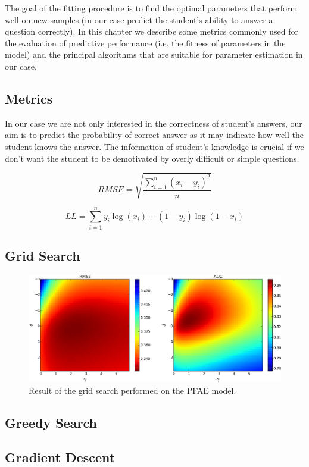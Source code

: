 The goal of the fitting procedure is to find the optimal parameters that perform well on new samples (in our case predict the student's ability to answer a question correctly). In this chapter we describe some metrics commonly used for the evaluation of predictive performance (i.e. the fitness of parameters in the model) and the principal algorithms that are suitable for parameter estimation in our case.

\subsection{Metrics}

In our case we are not only interested in the correctness of student's answers, our aim is to predict the probability of correct answer as it may indicate how well the student knows the answer. The information of student's knowledge is crucial if we don't want the student to be demotivated by overly difficult or simple questions.

\begin{equation} \label{rmse}
  RMSE = \sqrt{\frac{\sum_{i=1}^n (x_i - y_i)^2}{n}}
\end{equation}

\begin{equation} \label{ll}
  LL = \sum_{i=1}^n y_i \log(x_i) + (1 - y_i) \log(1 - x_i)
\end{equation}

\subsection{Grid Search}

\begin{figure}[htbp]
  \centering
  \includegraphics[width=\textwidth]{img/pfa-grid-search-rmse-auc}
  \caption{Result of the grid search performed on the PFAE model.}
  \label{fig-grid-search-rmse-auc}
\end{figure}

\subsection{Greedy Search}

\subsection{Gradient Descent}
